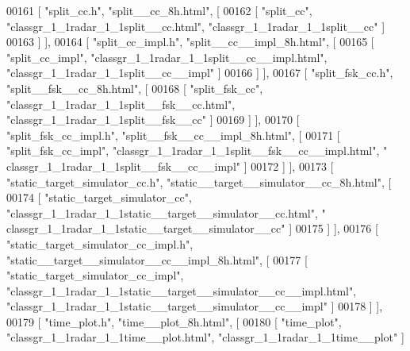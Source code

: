 \begin{DoxyCode}
00161     [ \textcolor{stringliteral}{"split\_cc.h"}, \textcolor{stringliteral}{"split\_\_cc\_8h.html"}, [
00162       [ \textcolor{stringliteral}{"split\_cc"}, \textcolor{stringliteral}{"classgr\_1\_1radar\_1\_1split\_\_cc.html"}, \textcolor{stringliteral}{"classgr\_1\_1radar\_1\_1split\_\_cc"} ]
00163     ] ],
00164     [ \textcolor{stringliteral}{"split\_cc\_impl.h"}, \textcolor{stringliteral}{"split\_\_cc\_\_impl\_8h.html"}, [
00165       [ \textcolor{stringliteral}{"split\_cc\_impl"}, \textcolor{stringliteral}{"classgr\_1\_1radar\_1\_1split\_\_cc\_\_impl.html"}, \textcolor{stringliteral}{"classgr\_1\_1radar\_1\_1split\_\_cc\_\_impl"} 
      ]
00166     ] ],
00167     [ \textcolor{stringliteral}{"split\_fsk\_cc.h"}, \textcolor{stringliteral}{"split\_\_fsk\_\_cc\_8h.html"}, [
00168       [ \textcolor{stringliteral}{"split\_fsk\_cc"}, \textcolor{stringliteral}{"classgr\_1\_1radar\_1\_1split\_\_fsk\_\_cc.html"}, \textcolor{stringliteral}{"classgr\_1\_1radar\_1\_1split\_\_fsk\_\_cc"} ]
00169     ] ],
00170     [ \textcolor{stringliteral}{"split\_fsk\_cc\_impl.h"}, \textcolor{stringliteral}{"split\_\_fsk\_\_cc\_\_impl\_8h.html"}, [
00171       [ \textcolor{stringliteral}{"split\_fsk\_cc\_impl"}, \textcolor{stringliteral}{"classgr\_1\_1radar\_1\_1split\_\_fsk\_\_cc\_\_impl.html"}, \textcolor{stringliteral}{"
      classgr\_1\_1radar\_1\_1split\_\_fsk\_\_cc\_\_impl"} ]
00172     ] ],
00173     [ \textcolor{stringliteral}{"static\_target\_simulator\_cc.h"}, \textcolor{stringliteral}{"static\_\_target\_\_simulator\_\_cc\_8h.html"}, [
00174       [ \textcolor{stringliteral}{"static\_target\_simulator\_cc"}, \textcolor{stringliteral}{"classgr\_1\_1radar\_1\_1static\_\_target\_\_simulator\_\_cc.html"}, \textcolor{stringliteral}{"
      classgr\_1\_1radar\_1\_1static\_\_target\_\_simulator\_\_cc"} ]
00175     ] ],
00176     [ \textcolor{stringliteral}{"static\_target\_simulator\_cc\_impl.h"}, \textcolor{stringliteral}{"static\_\_target\_\_simulator\_\_cc\_\_impl\_8h.html"}, [
00177       [ \textcolor{stringliteral}{"static\_target\_simulator\_cc\_impl"}, \textcolor{stringliteral}{"classgr\_1\_1radar\_1\_1static\_\_target\_\_simulator\_\_cc\_\_impl.html"}, \textcolor{stringliteral}{
      "classgr\_1\_1radar\_1\_1static\_\_target\_\_simulator\_\_cc\_\_impl"} ]
00178     ] ],
00179     [ \textcolor{stringliteral}{"time\_plot.h"}, \textcolor{stringliteral}{"time\_\_plot\_8h.html"}, [
00180       [ \textcolor{stringliteral}{"time\_plot"}, \textcolor{stringliteral}{"classgr\_1\_1radar\_1\_1time\_\_plot.html"}, \textcolor{stringliteral}{"classgr\_1\_1radar\_1\_1time\_\_plot"} ]

\end{DoxyCode}
